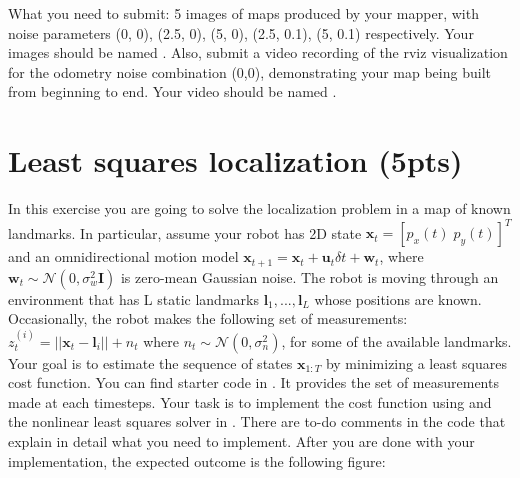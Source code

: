\documentclass[11pt, a4paper]{article}
\begin{document}
\newline
\newline
\noindent What you need to submit: 5 images of maps produced by your mapper, with noise parameters (0, 0), (2.5, 0), (5, 0), (2.5, 0.1), (5, 0.1) respectively.
Your images should be named . Also, submit a video recording of the rviz visualization for the odometry noise combination (0,0),
demonstrating your map being built from beginning to end. Your video should be named .

\section{Least squares localization (5pts)}
In this exercise you are going to solve the localization problem in a map of known landmarks. In particular, assume your robot has 2D state $\textbf{x}_t=[p_x(t) \; p_y(t)]^T$ and an omnidirectional motion model $\textbf{x}_{t+1}=\textbf{x}_t + \textbf{u}_t\delta t + \textbf{w}_t$, where $\textbf{w}_t \sim \mathcal{N}(0, \sigma_w^2\textbf{I})$ is zero-mean Gaussian noise. The robot is moving through an environment that has L static landmarks $\textbf{l}_1, ..., \textbf{l}_L$ whose positions are known. Occasionally, the robot makes the following set of measurements: $z_t^{(i)}=||\textbf{x}_t-\textbf{l}_i||+n_t$ where $n_t \sim \mathcal{N}(0, \sigma_n^2)$, for some of the available landmarks.
Your goal is to estimate the sequence of states $\textbf{x}_{1:T}$ by minimizing a least squares cost function.
\newline
\newline
\noindent You can find starter code in . It provides the set of measurements made at each timesteps. Your task is to implement the cost
function using  and the nonlinear least squares solver in . There are to-do comments in the code that explain in detail what you need to implement.
After you are done with your implementation, the expected outcome is the following figure:
\end{document}
